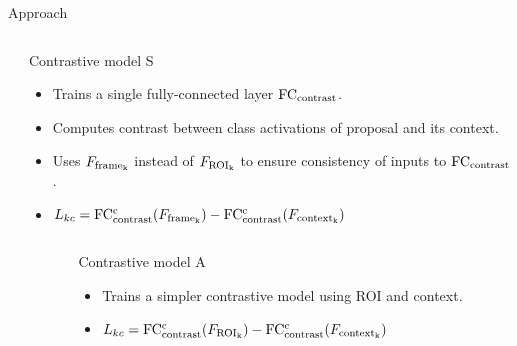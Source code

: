 \documentclass[final, xcolor={dvipsnames}]{beamer}
\begin{document}
\begin{frame}[t,fragile]{}
\begin{mdframed}[style = posterframe]
\begin{columns}[t,onlytextwidth]
\begin{column}{.44\linewidth}
\begin{block}{Approach}
		\modelsep
		\begin{columns}[T,onlytextwidth]
			\begin{column}{\columnsizemodel}\end{column}
			\begin{column}{\columnsizedescr}
				\begin{block}{\small Contrastive model S}
				\vspace{-0.5cm}
				\begin{itemize}
					\item Trains a single fully-connected layer ${\rm FC_{contrast}}$.
					\item Computes contrast between class activations of proposal and its context.
					\item Uses $F_{\rm frame_k}$ instead of $F_{\rm ROI_k}$ to ensure consistency of inputs to ${\rm FC_{contrast}}$.
					\item $L_{kc} = {\rm FC_{contrast}^{c}}(F_{\rm frame_k}) - {\rm FC_{contrast}^{c}}(F_{\rm context_k})$
				\end{itemize}
				\end{block}
			\end{column}
		\end{columns}
		
		\modelsep
		\begin{columns}[T,onlytextwidth]
			\begin{column}{\columnsizemodel}\end{column}
			\begin{column}{\columnsizedescr}
				\begin{block}{\small Contrastive model A}
				\begin{itemize}
					\item Trains a simpler contrastive model using ROI and context.
					\item $L_{kc} = {\rm FC_{contrast}^{c}}(F_{\rm ROI_k}) - {\rm FC_{contrast}^{c}}(F_{\rm context_k})$
				\end{itemize}
				\end{block}
			\end{column}
		\end{columns}
		

\end{block}
\end{column}
\end{columns}
\end{mdframed}
\end{frame}
\end{document}
